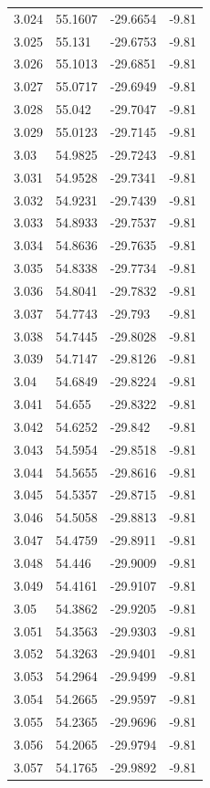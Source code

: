 \begin{tabular}{llll}
3.024 & 55.1607 & -29.6654 & -9.81 \\
3.025 & 55.131 & -29.6753 & -9.81 \\
3.026 & 55.1013 & -29.6851 & -9.81 \\
3.027 & 55.0717 & -29.6949 & -9.81 \\
3.028 & 55.042 & -29.7047 & -9.81 \\
3.029 & 55.0123 & -29.7145 & -9.81 \\
3.03 & 54.9825 & -29.7243 & -9.81 \\
3.031 & 54.9528 & -29.7341 & -9.81 \\
3.032 & 54.9231 & -29.7439 & -9.81 \\
3.033 & 54.8933 & -29.7537 & -9.81 \\
3.034 & 54.8636 & -29.7635 & -9.81 \\
3.035 & 54.8338 & -29.7734 & -9.81 \\
3.036 & 54.8041 & -29.7832 & -9.81 \\
3.037 & 54.7743 & -29.793 & -9.81 \\
3.038 & 54.7445 & -29.8028 & -9.81 \\
3.039 & 54.7147 & -29.8126 & -9.81 \\
3.04 & 54.6849 & -29.8224 & -9.81 \\
3.041 & 54.655 & -29.8322 & -9.81 \\
3.042 & 54.6252 & -29.842 & -9.81 \\
3.043 & 54.5954 & -29.8518 & -9.81 \\
3.044 & 54.5655 & -29.8616 & -9.81 \\
3.045 & 54.5357 & -29.8715 & -9.81 \\
3.046 & 54.5058 & -29.8813 & -9.81 \\
3.047 & 54.4759 & -29.8911 & -9.81 \\
3.048 & 54.446 & -29.9009 & -9.81 \\
3.049 & 54.4161 & -29.9107 & -9.81 \\
3.05 & 54.3862 & -29.9205 & -9.81 \\
3.051 & 54.3563 & -29.9303 & -9.81 \\
3.052 & 54.3263 & -29.9401 & -9.81 \\
3.053 & 54.2964 & -29.9499 & -9.81 \\
3.054 & 54.2665 & -29.9597 & -9.81 \\
3.055 & 54.2365 & -29.9696 & -9.81 \\
3.056 & 54.2065 & -29.9794 & -9.81 \\
3.057 & 54.1765 & -29.9892 & -9.81 \\

\end{tabular}

